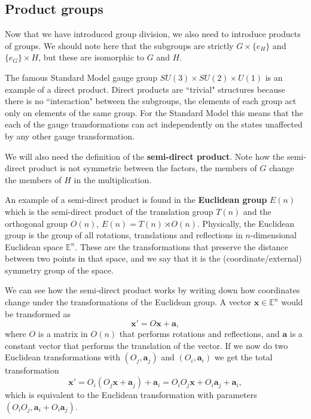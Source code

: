 \documentclass[notes.tex]{subfiles}
\begin{document}
\subsection{Product groups}
Now that we have introduced group division,  we also need to introduce products of groups. 
We should note here that the subgroups are strictly $G\times\{e_H\}$ and $\{e_G\}\times H$, but these are isomorphic to $G$ and $H$. 

The famous Standard Model gauge group $SU(3) \times SU(2)\times U(1)$ is an example of a direct product. Direct products are ``trivial" structures because there is no ``interaction" between the subgroups, the elements of each group act only on elements of the same group. For the Standard Model this means that the each of the gauge transformations can act independently on the states unaffected by any other gauge transformation. 

We will also need the definition of the {\bf semi-direct product}.
Note how the semi-direct product is not symmetric between the factors, the members of $G$ change the members of $H$ in the multiplication.

An example of a semi-direct product is found in the {\bf Euclidean group} $E(n)$ which is the semi-direct product of the translation group $T(n)$ and the orthogonal group $O(n)$, $E(n) = T(n)\rtimes O(n)$.  Physically, the Euclidean group is the group of all rotations, translations and reflections in $n$-dimensional Euclidean space $\mathbb {E}^n$. These are the transformations that preserve the distance between two points in that space, and we say that it is the (coordinate/external) symmetry group of the space. 

We can see how the semi-direct product works by writing down how coordinates change under the transformations of the Euclidean group. A vector $\mathbf x \in \mathbb {E}^n$ would be transformed as
\[ \mathbf x' = O\mathbf x + \mathbf a,\]
where $O$ is a matrix in $O(n)$ that performs rotations and reflections, and $\mathbf a$ is a constant vector that performs the translation of the vector. If we now do two Euclidean transformations with $(O_j,\mathbf a_j)$ and $(O_i,\mathbf a_i)$ we get the total transformation
\[ \mathbf x' = O_i(O_j\mathbf x + \mathbf a_j)+\mathbf a_i= O_iO_j\mathbf x + O_i\mathbf a_j+\mathbf a_i,\]
which is equivalent to the Euclidean transformation with parameters $(O_iO_j,\mathbf a_i  +O_i\mathbf a_j)$.
\end{document}
